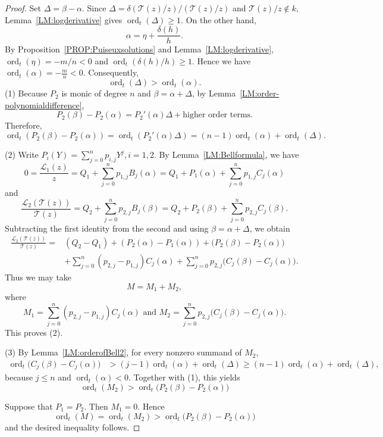 \documentclass[10pt,a4paper]{amsart}
\DeclareMathOperator{\ord}{ord}
\newcommand{\calL}{{\mathcal{L}}}
\newcommand{\calT}{{\mathcal{T}}}
\begin{document}
\begin{proof}
Set $\Delta=\beta-\alpha$.
Since $\Delta=\delta(\calT(z)/z)/(\calT(z)/z)$ and $\calT(z)/z\notin k$,  Lemma~\ref{LM:logderivative} gives
$
  \ord_t(\Delta)\geq 1.
$
On the other hand,
\[
  \alpha=\eta+\frac{\delta (h)}{h}.
\]
By Proposition~\ref{PROP:Puiseuxsolutions} and 
Lemma~\ref{LM:logderivative}, $\ord_t(\eta)=-m/n<0$ and
$\ord_t(\delta(h)/h)\geq 1$. Hence we have
$
  \ord_t(\alpha)=-\frac{m}{n}<0.
$
Consequently,
$$
  \ord_t(\Delta)>\ord_t(\alpha).
$$
(1) Because $P_2$ is monic of degree $n$ and $\beta=\alpha+\Delta$, by Lemma~\ref{LM:order-polynomialdifference},
$$
   P_2(\beta)-P_2(\alpha)=P_2'(\alpha)\Delta+\text{higher order terms}.
$$
Therefore,
\[
  \ord_t(P_2(\beta)-P_2(\alpha))
  =\ord_t(P_2'(\alpha)\Delta)=(n-1)\ord_t(\alpha)+\ord_t(\Delta).
\]


(2) Write
$
  P_i(Y)=\sum_{j=0}^n p_{i,j}Y^j, i=1,2.
$
By Lemma~\ref{LM:Bellformula}, we have 
\[
  0=\frac{\calL_1(z)}{z}
   =Q_1+\sum_{j=0}^n p_{1,j}B_j(\alpha)=Q_1+P_1(\alpha)+\sum_{j=0}^n p_{1,j}C_j(\alpha)
\]
and
\[
  \frac{\calL_2(\calT(z))}{\calT(z)}
   =Q_2+\sum_{j=0}^n p_{2,j}B_j(\beta)=Q_2+P_2(\beta)+\sum_{j=0}^n p_{2,j}C_j(\beta).
\]
Subtracting the first identity from the second and using
$\beta=\alpha+\Delta$, we obtain
\[
\begin{aligned}
  \frac{\calL_2(\calT(z))}{\calT(z)}
  ={}&(Q_2-Q_1)+(P_2(\alpha)-P_1(\alpha))
     +\bigl(P_2(\beta)-P_2(\alpha)\bigr)\\
   &+\sum_{j=0}^n(p_{2,j}-p_{1,j})C_j(\alpha)
     +\sum_{j=0}^n p_{2,j}
       \bigl(C_j(\beta)-C_j(\alpha)\bigr).
\end{aligned}
\]
Thus we may take
\[
  M=M_1+M_2,
\]
where
\[
  M_1=\sum_{j=0}^n(p_{2,j}-p_{1,j})C_j(\alpha)\,\,\text{and}\,\,
  M_2=\sum_{j=0}^n p_{2,j}
       \bigl(C_j(\beta)-C_j(\alpha)\bigr).
\]
This proves (2). 


(3) By Lemma~\ref{LM:orderofBell2}, for every nonzero summand of $M_2$,
\[
\begin{aligned}
  \ord_t\bigl(C_j(\beta)-C_j(\alpha)\bigr)
  &>(j-1)\ord_t(\alpha)+\ord_t(\Delta)\geq (n-1)\ord_t(\alpha)+\ord_t(\Delta),
\end{aligned}
\]
because $j\leq n$ and $\ord_t(\alpha)<0$. Together with (1), this yields
\begin{equation}
  \label{EQ:M2}
  \ord_t(M_2)>
  \ord_t\bigl(P_2(\beta)-P_2(\alpha)\bigr)
\end{equation}

Suppose that $P_1=P_2$. Then $M_1=0$. Hence
$$
  \ord_t(M)=\ord_t(M_2)>\ord_t\bigl(P_2(\beta)-P_2(\alpha)\bigr)
$$
and the desired inequality follows. 


\end{proof}
\end{document}

